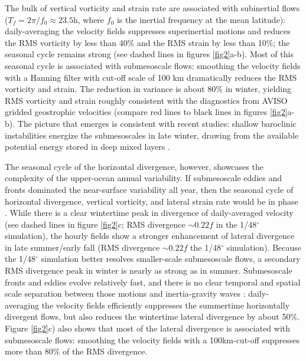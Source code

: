 \documentclass[grl]{agutex2015}
\begin{document}
\begin{article}
The bulk of vertical vorticity and strain rate are associated with subinertial flows
($T_f = 2\pi/f_0\approx 23.5$h, where $f_0$ is the inertial frequency at
the mean latitude): daily-averaging the velocity fields suppresses superinertial
motions and reduces the RMS
vorticity by less than 40$\%$ and the RMS strain by less than 10$\%$; the seasonal
cycle remains strong (see
dashed lines in figures \ref{fig2}a-b). Most of this seasonal cycle is associated
with submesoscale flows: smoothing the velocity fields
with a Hanning filter with cut-off scale of 100 km dramatically reduces the RMS
vorticity and strain. The reduction in variance is about 80$\%$ in winter,
yielding RMS vorticity and strain roughly consistent with the diagnostics from
AVISO gridded geostrophic velocities (compare red lines to black lines in figures \ref{fig2}a-b).
The picture that emerges is consistent with recent studies: shallow baroclinic
instabilities energize the submesoscales in late winter, drawing from the available
potential energy stored in deep mixed layers \citep{sasaki_etal2014,callies_etal2015,callies_etal2016}.

The seasonal cycle of the horizontal divergence, however, showcases the complexity
of the upper-ocean annual variability. If submesoscale eddies and fronts dominated
the near-surface variability all year, then the seasonal cycle of horizontal divergence,
vertical vorticity, and lateral strain rate would be in phase \citep[e.g.,][]{sasaki_etal2014}.
While there is a clear wintertime peak in divergence of daily-averaged velocity
(see dashed lines in figure \ref{fig2}c; RMS divergence $\sim0.22 f$ in the 1/48$^\circ$
simulation), the hourly fields show
a stronger enhancement of
lateral divergence in late summer/early fall (RMS divergence $\sim0.22 f$ the 1/48$^\circ$
simulation). Because the 1/48$^\circ$ simulation better resolves
smaller-scale submesoscale flows, a secondary RMS divergence peak in winter  is
nearly as strong as in summer. Submesoscale fronts and eddies evolve
relatively fast, and there is no clear
temporal and spatial scale separation between those motions and inertia-gravity waves
\citep{mcwilliams2016}:
daily-averaging the velocity fields efficiently suppresses the summertime horizontally
divergent flows, but also reduces the wintertime lateral divergence by about 50$\%$.
Figure \ref{fig2}c) also shows that most of the lateral divergence is associated
with submesoscale flows: smoothing the velocity fields with a 100km-cut-off
suppresses more than 80$\%$ of the RMS divergence.



\end{article}
\end{document}
